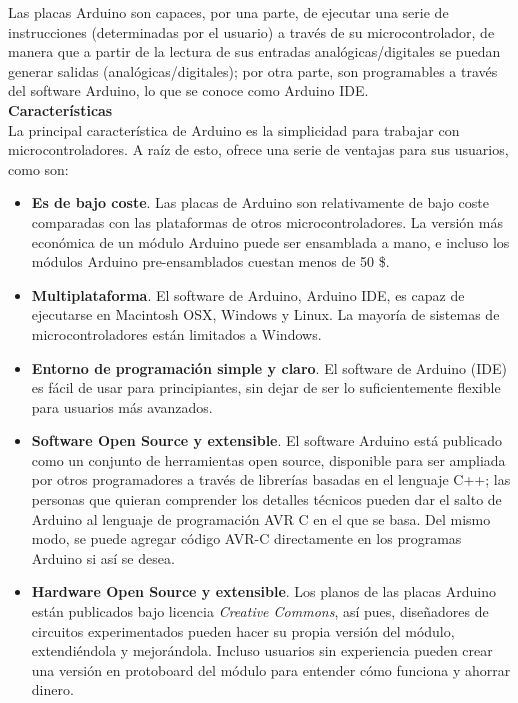 \documentclass[12pt]{article}
\begin{document}
	\noindent Las placas Arduino son capaces, por una parte, de ejecutar una serie de instrucciones (determinadas por el usuario) a través de su microcontrolador, de manera que a partir de la lectura de sus entradas analógicas/digitales se puedan generar salidas (analógicas/digitales); por otra parte, son programables a través del software Arduino, lo que se conoce como Arduino IDE. \\
	
	\noindent \textbf{Características} \\
	
	\noindent La principal característica de Arduino es la simplicidad para trabajar con microcontroladores. A raíz de esto, ofrece una serie de ventajas para sus usuarios, como son:
	\begin{itemize}
		\item \textbf{Es de bajo coste}. Las placas de Arduino son relativamente de bajo coste comparadas con las plataformas de otros microcontroladores. La versión más económica de un módulo Arduino puede ser ensamblada a mano, e incluso los módulos Arduino pre-ensamblados cuestan menos de 50 \$.
		\item \textbf{Multiplataforma}. El software de Arduino, Arduino IDE, es capaz de ejecutarse en Macintosh OSX, Windows y Linux. La mayoría de sistemas de microcontroladores están limitados a Windows.
		\item  	\textbf{Entorno de programación simple y claro}. El software de Arduino (IDE) es fácil de usar para principiantes, sin dejar de ser lo suficientemente flexible para usuarios más avanzados.
		\item \textbf{Software Open Source y extensible}. El software Arduino está publicado como un conjunto de herramientas open source, disponible para ser ampliada por otros programadores a través de librerías basadas en el lenguaje C++; las personas que quieran comprender los detalles técnicos pueden dar el salto de Arduino al lenguaje de programación AVR C en el que se basa. Del mismo modo, se puede agregar código AVR-C directamente en los  programas Arduino si así se desea.
		\item \textbf{Hardware Open Source y extensible}. Los planos de las placas Arduino están publicados bajo licencia \textit{Creative Commons}, así pues, diseñadores de circuitos experimentados pueden hacer su propia versión del módulo, extendiéndola y mejorándola. Incluso usuarios sin experiencia pueden crear una versión en protoboard del módulo para entender cómo funciona y ahorrar dinero.
	
	\end{itemize}
\end{document}
